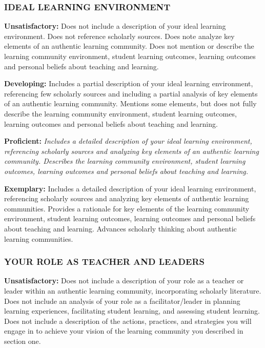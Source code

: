 \documentclass[
]{book}
\begin{document}
\hypertarget{ideal-learning-environment}{%
\subsubsection*{IDEAL LEARNING ENVIRONMENT}\label{ideal-learning-environment}}

\textbf{Unsatisfactory:} Does not include a description of your ideal learning environment. Does not reference scholarly sources. Does note analyze key elements of an authentic learning community. Does not mention or describe the learning community environment, student learning outcomes, learning outcomes and personal beliefs about teaching and learning.

\textbf{Developing:} Includes a partial description of your ideal learning environment, referencing few scholarly sources and including a partial analysis of key elements of an authentic learning community. Mentions some elements, but does not fully describe the learning community environment, student learning outcomes, learning outcomes and personal beliefs about teaching and learning.

\textbf{Proficient:} \emph{Includes a detailed description of your ideal learning environment, referencing scholarly sources and analyzing key elements of an authentic learning community. Describes the learning community environment, student learning outcomes, learning outcomes and personal beliefs about teaching and learning.}

\textbf{Exemplary:} Includes a detailed description of your ideal learning environment, referencing scholarly sources and analyzing key elements of authentic learning communities. Provides a rationale for key elements of the learning community environment, student learning outcomes, learning outcomes and personal beliefs about teaching and learning. Advances scholarly thinking about authentic learning communities.

\hypertarget{your-role-as-teacher-and-leaders}{%
\subsubsection*{YOUR ROLE AS TEACHER AND LEADERS}\label{your-role-as-teacher-and-leaders}}

\textbf{Unsatisfactory:} Does not include a description of your role as a teacher or leader within an authentic learning community, incorporating scholarly literature. Does not include an analysis of your role as a facilitator/leader in planning learning experiences, facilitating student learning, and assessing student learning. Does not include a description of the actions, practices, and strategies you will engage in to achieve your vision of the learning community you described in section one.
\end{document}
